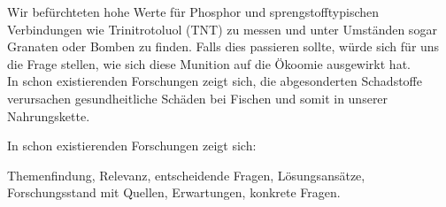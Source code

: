 Wir befürchteten hohe Werte für Phosphor und sprengstofftypischen Verbindungen wie Trinitrotoluol (TNT) 
zu messen und unter Umständen sogar Granaten oder Bomben zu finden. Falls dies passieren sollte, würde 
sich für uns die Frage stellen, wie sich diese Munition auf die Ökoomie ausgewirkt hat. \\

In schon existierenden Forschungen zeigt sich, die abgesonderten Schadstoffe verursachen gesundheitliche Schäden bei Fischen 
und somit in unserer Nahrungskette. 
%
%
%


In schon existierenden Forschungen\cite{munitionsbelastung} zeigt sich:




Themenfindung, Relevanz, entscheidende Fragen, Lösungsansätze, Forschungsstand mit Quellen, Erwartungen, konkrete Fragen.

